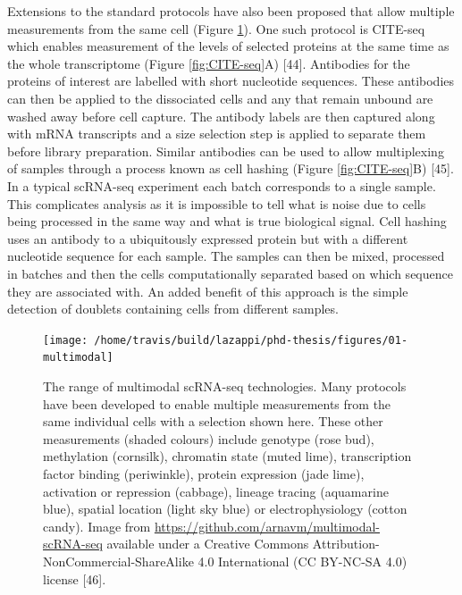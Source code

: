 \documentclass[11pt,a4paper,titlepage,twoside,openright]{style/unimelbthesis}
\theoremstyle{definition}
\theoremstyle{definition}
\theoremstyle{definition}
\theoremstyle{remark}
\begin{document}
\begin{mainmatter}
Extensions to the standard protocols have also been proposed that allow multiple measurements from the same cell (Figure \ref{fig:multimodal}). One such protocol is CITE-seq which enables measurement of the levels of selected proteins at the same time as the whole transcriptome (Figure \ref{fig:CITE-seq}A) {[}44{]}. Antibodies for the proteins of interest are labelled with short nucleotide sequences. These antibodies can then be applied to the dissociated cells and any that remain unbound are washed away before cell capture. The antibody labels are then captured along with mRNA transcripts and a size selection step is applied to separate them before library preparation. Similar antibodies can be used to allow multiplexing of samples through a process known as cell hashing (Figure \ref{fig:CITE-seq}B) {[}45{]}. In a typical scRNA-seq experiment each batch corresponds to a single sample. This complicates analysis as it is impossible to tell what is noise due to cells being processed in the same way and what is true biological signal. Cell hashing uses an antibody to a ubiquitously expressed protein but with a different nucleotide sequence for each sample. The samples can then be mixed, processed in batches and then the cells computationally separated based on which sequence they are associated with. An added benefit of this approach is the simple detection of doublets containing cells from different samples.

\begin{figure}

{\centering \texttt{[image: /home/travis/build/lazappi/phd-thesis/figures/01-multimodal]} 

}

\caption[The range of multimodal scRNA-seq technologies.]{The range of multimodal scRNA-seq technologies. Many protocols have been developed to enable multiple measurements from the same individual cells with a selection shown here. These other measurements (shaded colours) include genotype (rose bud), methylation (cornsilk), chromatin state (muted lime), transcription factor binding (periwinkle), protein expression (jade lime), activation or repression (cabbage), lineage tracing (aquamarine blue), spatial location (light sky blue) or electrophysiology (cotton candy). Image from \url{https://github.com/arnavm/multimodal-scRNA-seq} available under a Creative Commons Attribution-NonCommercial-ShareAlike 4.0 International (CC BY-NC-SA 4.0) license {[}46{]}.}\label{fig:multimodal}
\end{figure}






\end{mainmatter}
\end{document}
